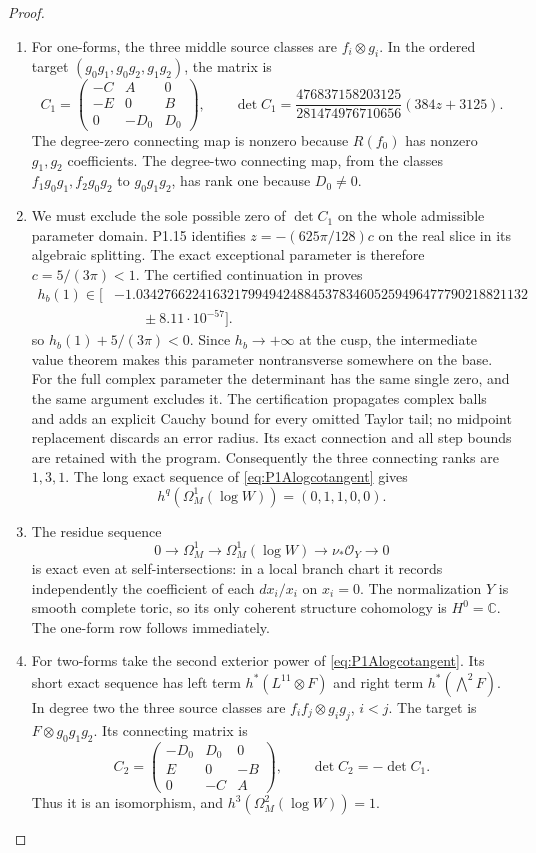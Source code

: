 \documentclass[11pt,a4paper]{article}
\theoremstyle{definition}
\begin{document}
\begin{proof}
\begin{enumerate}[label=\arabic*.]
\item For one-forms, the three middle source classes are $f_i\otimes g_i$.
In the ordered target $(g_0g_1,g_0g_2,g_1g_2)$, the matrix is
\[
C_1=\begin{pmatrix}-C&A&0\\-E&0&B\\0&-D_0&D_0\end{pmatrix},
\qquad
\det C_1=
\frac{476837158203125}{281474976710656}(384z+3125).
\]
The degree-zero connecting map is nonzero because $R(f_0)$
has nonzero $g_1,g_2$ coefficients. The degree-two connecting
map, from the classes $f_1g_0g_1,f_2g_0g_2$ to $g_0g_1g_2$,
has rank one because $D_0\ne0$.

\item We must exclude the sole possible zero of $\det C_1$ on the
whole admissible parameter domain. P1.15 identifies
$z=-(625\pi/128)c$ on the real slice in its algebraic splitting.
The exact exceptional parameter is therefore $c=5/(3\pi)<1$.
The certified continuation in
 proves
\[
\begin{aligned}
h_b(1)\in\bigl[&
-1.03427662241632179949424884537834605259496477790218821132\\
&\qquad\mathbin{\pm}8.11\cdot10^{-57}\bigr].
\end{aligned}
\]
so $h_b(1)+5/(3\pi)<0$. Since $h_b\to+\infty$ at the cusp,
the intermediate value theorem makes this parameter
nontransverse somewhere on the base. For the full complex
parameter the determinant has the same single zero, and the
same argument excludes it. The certification propagates complex
balls and adds an explicit Cauchy bound for every omitted
Taylor tail; no midpoint replacement discards an error radius.
Its exact connection and all step bounds are retained with the
program. Consequently the three connecting ranks are $1,3,1$.
The long exact sequence of \eqref{eq:P1Alogcotangent} gives
\[
h^q(\Omega_M^1(\log W))=(0,1,1,0,0).
\]

\item The residue sequence
\[
0\to\Omega_M^1\to\Omega_M^1(\log W)\to\nu_*\mathcal O_Y\to0
\]
is exact even at self-intersections: in a local branch chart it
records independently the coefficient of each $dx_i/x_i$ on
$x_i=0$. The normalization $Y$ is smooth complete toric, so its
only coherent structure cohomology is $H^0=\mathbb C$.
The one-form row follows immediately.

\item For two-forms take the second exterior power of
\eqref{eq:P1Alogcotangent}. Its short exact sequence has left
term $h^*(L^{11}\otimes F)$ and right term
$h^*(\bigwedge^2F)$. In degree two the three source classes
are $f_if_j\otimes g_ig_j$, $i<j$. The target is
$F\otimes g_0g_1g_2$. Its connecting matrix is
\[
C_2=\begin{pmatrix}-D_0&D_0&0\\E&0&-B\\0&-C&A\end{pmatrix},
\qquad \det C_2=-\det C_1.
\]
Thus it is an isomorphism, and
$h^3(\Omega_M^2(\log W))=1$.


\end{enumerate}
\end{proof}
\end{document}
